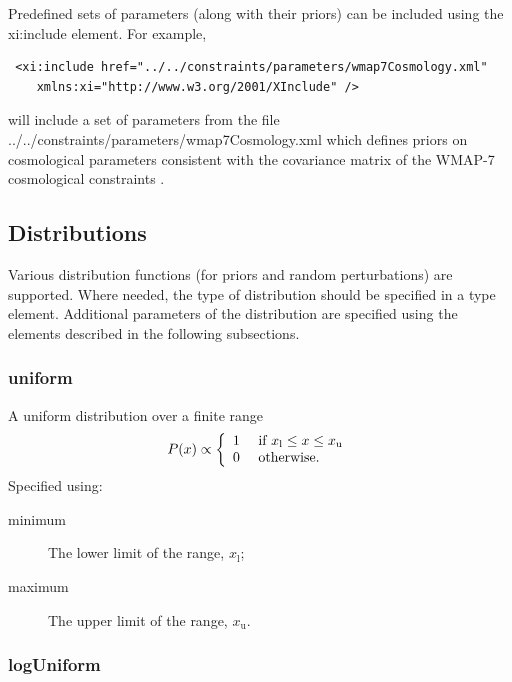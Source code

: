 Predefined sets of parameters (along with their priors) can be included using the {\normalfont \ttfamily xi:include} element. For example,
\begin{verbatim}
 <xi:include href="../../constraints/parameters/wmap7Cosmology.xml"
    xmlns:xi="http://www.w3.org/2001/XInclude" />
\end{verbatim}
will include a set of parameters from the file {\normalfont \ttfamily ../../constraints/parameters/wmap7Cosmology.xml} which defines priors on cosmological parameters consistent with the covariance matrix of the WMAP-7 cosmological constraints \citep{komatsu_seven-year_2010}.

\subsection{Distributions}

Various distribution functions (for priors and random perturbations) are supported. Where needed, the type of distribution should be specified in a {\normalfont \ttfamily type} element. Additional parameters of the distribution are specified using the elements described in the following subsections.

\subsubsection{{\normalfont \ttfamily uniform}}

A uniform distribution over a finite range
\begin{equation}
P(x) \propto \left\{ \begin{array}{ll} 1 & \hbox{ if } x_{\mathrm l} \leq x \leq x_{\mathrm u} \\ 0 & \hbox{ otherwise.}  \end{array} \right.
\end{equation}
Specified using:
\begin{description}
\item[{\normalfont \ttfamily minimum}] The lower limit of the range, $x_{\mathrm l}$;
\item[{\normalfont \ttfamily maximum}] The upper limit of the range, $x_{\mathrm u}$.
\end{description}

\subsubsection{{\normalfont \ttfamily logUniform}}


